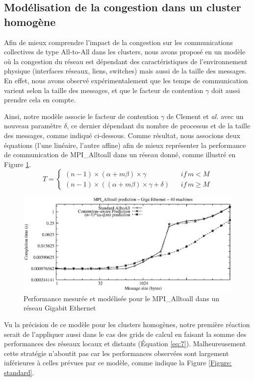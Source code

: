\subsection{Modélisation de la congestion dans un cluster homogène}

Afin de mieux comprendre l'impact de la congestion sur les communications collectives de type All-to-All dans les clusters, nous avons proposé en \cite{Steffenel06b} un modèle où la congestion du réseau est dépendant des caractéristiques de l'environnement physique (interfaces réseaux, liens, switches) mais aussi de la taille des messages. En effet, nous avons observé expérimentalement que les temps de communication varient selon la taille des messages,  et que le facteur de contention  $\gamma$ doit aussi prendre cela en compte. 

Ainsi, notre modèle associe le facteur de contention $\gamma$ de Clement et \textit{al.} \cite{Clement96} avec un nouveau paramètre $\delta$, ce dernier dépendant du nombre de processus et de la taille des messages, comme indiqué ci-dessous. Comme résultat, nous associons deux équations (l'une linéaire, l'autre affine) afin de mieux représenter la performance de communication de MPI\_Alltoall dans un réseau donné, comme illustré en Figure \ref{Figure: local}.
\begin{equation}
T=\left\{ \begin{array}{lc}
(n-1)\times(\alpha+m\beta)\times\gamma & if\, m<M\\
(n-1)\times((\alpha+m\beta)\times\gamma+\delta)\,\,\,\,\, & if\, m\geq M\end{array}\right.\label{eq:6}\end{equation}

\begin{figure}
	\centering
		\includegraphics[width=0.7\columnwidth]{images/newcomp24_pred_log}
	\caption{\label{Figure: local}Performance mesurée et modélisée pour le MPI\_Alltoall dans un réseau Gigabit Ethernet}
\end{figure}


Vu la précision de ce modèle pour les clusters homogènes, notre première réaction serait de l'appliquer aussi dans le cas des grids de calcul en faisant la somme des performances des réseaux locaux et distants (Équation \ref{eq:7}). Malheureusement cette stratégie n'aboutit pas car les performances observées sont largement inférieures à celles prévues par ce modèle, comme indique la Figure \ref{Figure: standard}. 

